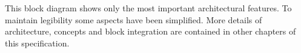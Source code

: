 This block diagram shows only the most important architectural features. To maintain legibility some aspects have been simplified. More details of architecture, concepts and block integration are contained in other chapters of this specification.